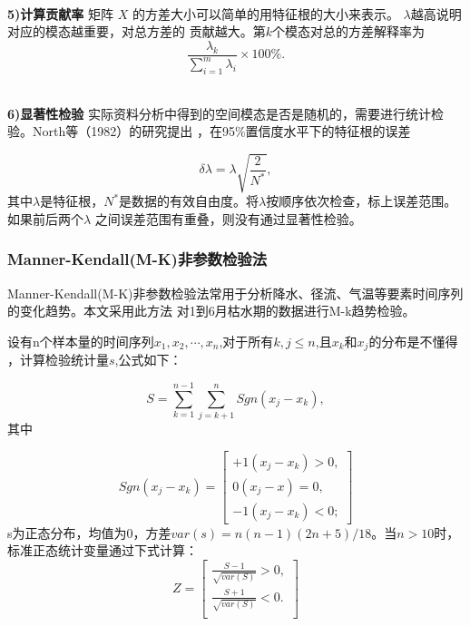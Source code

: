 \documentclass{whutmod}
\begin{document}
\begin{spacing}{1.2}
~\\
\textbf{5)计算贡献率}
矩阵 $X$ 的方差大小可以简单的用特征根的大小来表示。 $\lambda $越高说明对应的模态越重要，对总方差的
贡献越大。第$k$个模态对总的方差解释率为
\begin{equation}\label{eq:dirchlet}
	\frac{\lambda_k}{\sum_{i=1}^m\lambda_i}\times100\%.
\end{equation}

~\\
\textbf{6)显著性检验}
实际资料分析中得到的空间模态是否是随机的，需要进行统计检验。North等（1982）的研究提出
，在95\%置信度水平下的特征根的误差

\begin{equation}\label{eq:dirchlet}
	\delta \lambda = \lambda \sqrt{\frac{2}{N^*}},
\end{equation}
其中$\lambda$是特征根，$N^*$是数据的有效自由度。将$\lambda$按顺序依次检查，标上误差范围。如果前后两个$\lambda$
之间误差范围有重叠，则没有通过显著性检验。



\subsubsection{Manner-Kendall(M-K)非参数检验法}

Manner-Kendall(M-K)非参数检验法常用于分析降水、径流、气温等要素时间序列的变化趋势。本文采用此方法
对1到6月枯水期的数据进行M-k趋势检验。

设有n个样本量的时间序列$x_{1},x_{2},\cdots,x_{n}$,对于所有$k,j \le n $,且$x_k$和$x_j$的分布是不懂得
，计算检验统计量$s$,公式如下：

\begin{equation}\label{eq:dirchlet}
	S=\sum_{k=1}^{n-1}\sum_{j=k+1}^{n} Sgn(x_j-x_k),
\end{equation}
其中

\begin{equation}\label{eq:dirchlet}
	Sgn(x_j-x_k)=\begin{bmatrix}
		+1(x_j-x_k)>0,\\
		0(x_j-x)=0,\\
		-1(x_j-x_k)<0;
	\end{bmatrix}
\end{equation}
s为正态分布，均值为0，方差$var(s)=n(n-1)(2n+5)/18$。当$n>10$时，标准正态统计变量通过下式计算：
\begin{equation}\label{eq:dirchlet}
	Z=\begin{bmatrix}
		\frac{S-1}{\sqrt{var(S)}}>0,\\
		\frac{S+1}{\sqrt{var(S)}}<0.\\
	\end{bmatrix}
\end{equation}







\end{spacing}
\end{document}
